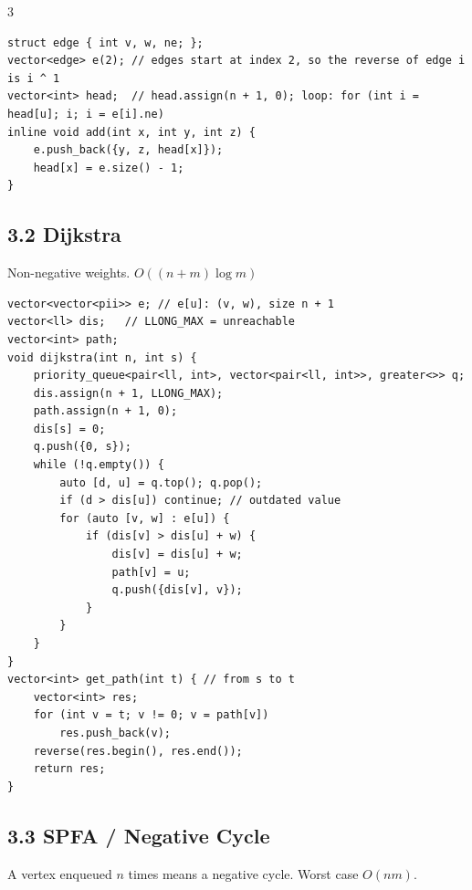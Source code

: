 \documentclass[8pt]{extarticle}
\begin{document}
\begin{multicols*}{3}
\begin{lstlisting}
struct edge { int v, w, ne; };
vector<edge> e(2); // edges start at index 2, so the reverse of edge i is i ^ 1
vector<int> head;  // head.assign(n + 1, 0); loop: for (int i = head[u]; i; i = e[i].ne)
inline void add(int x, int y, int z) {
    e.push_back({y, z, head[x]});
    head[x] = e.size() - 1;
}
\end{lstlisting}

\subsection*{3.2 Dijkstra}

Non-negative weights. $O((n + m) \log m)$

\begin{lstlisting}
vector<vector<pii>> e; // e[u]: (v, w), size n + 1
vector<ll> dis;   // LLONG_MAX = unreachable
vector<int> path;
void dijkstra(int n, int s) {
    priority_queue<pair<ll, int>, vector<pair<ll, int>>, greater<>> q;
    dis.assign(n + 1, LLONG_MAX);
    path.assign(n + 1, 0);
    dis[s] = 0;
    q.push({0, s});
    while (!q.empty()) {
        auto [d, u] = q.top(); q.pop();
        if (d > dis[u]) continue; // outdated value
        for (auto [v, w] : e[u]) {
            if (dis[v] > dis[u] + w) {
                dis[v] = dis[u] + w;
                path[v] = u;
                q.push({dis[v], v});
            }
        }
    }
}
vector<int> get_path(int t) { // from s to t
    vector<int> res;
    for (int v = t; v != 0; v = path[v])
        res.push_back(v);
    reverse(res.begin(), res.end());
    return res;
}
\end{lstlisting}

\subsection*{3.3 SPFA / Negative Cycle}

A vertex enqueued $n$ times means a negative cycle. Worst case $O(nm)$.


\end{multicols*}
\end{document}
